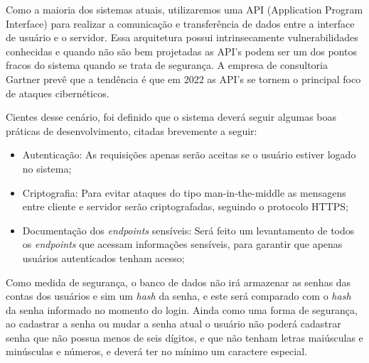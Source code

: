 Como a maioria dos sistemas atuais, utilizaremos uma API (Application Program Interface) para realizar a comunicação e transferência de dados entre a interface de usuário e o servidor. Essa arquitetura possui intrinsecamente vulnerabilidades conhecidas e quando não são bem projetadas as API’s podem ser um dos pontos fracos do sistema quando se trata de segurança. A empresa de consultoria Gartner \cite{anilLamba} prevê que a tendência é que em 2022 as API’s se tornem o principal foco de ataques cibernéticos.

Cientes desse cenário, foi definido que o sistema deverá seguir algumas boas práticas de desenvolvimento, citadas brevemente a seguir:
\begin{itemize}
	\item Autenticação: As requisições apenas serão aceitas se o usuário estiver logado no sistema;
	\item Criptografia: Para evitar ataques do tipo man-in-the-middle as mensagens entre cliente e servidor serão criptografadas, seguindo o protocolo HTTPS;
	\item Documentação dos \textit{endpoints} sensíveis: Será feito um levantamento de todos os \textit{endpoints} que acessam informações sensíveis, para garantir que apenas usuários autenticados tenham acesso;
\end{itemize}

Como medida de segurança, o banco de dados não irá armazenar as senhas das contas dos usuários e sim um \textit{hash} da senha, e este será comparado com o \textit{hash} da senha informado no momento do login. Ainda como uma forma de segurança, ao cadastrar a senha ou mudar a senha atual o usuário não poderá cadastrar senha que não possua menos de seis dígitos, e que não tenham letras maiúsculas e minúsculas e números, e deverá ter no mínimo um caractere especial.

